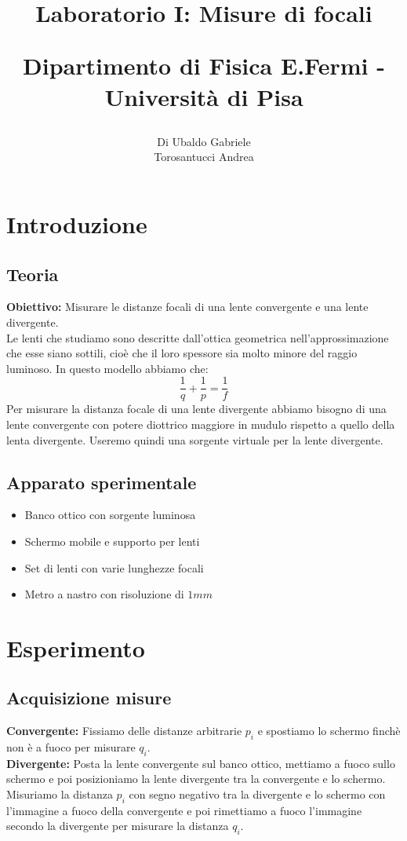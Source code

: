\documentclass[a4paper,10pt]{article}
\title{Laboratorio I: Misure di focali\\
\begin{large}
Dipartimento di Fisica E.Fermi - Università di Pisa
\end{large}}
\author{Di Ubaldo Gabriele \\Torosantucci Andrea}
\date{}
\begin{document}
\maketitle

\tableofcontents

\section{Introduzione}
\subsection{Teoria}
\textbf{Obiettivo:} Misurare le distanze focali di una lente convergente e una lente divergente.\\
Le lenti che studiamo sono descritte dall'ottica geometrica nell'approssimazione che esse siano sottili, cioè che il loro spessore sia molto minore del raggio luminoso.
In questo modello abbiamo che:
\begin{equation}
 \frac{1}{q}+\frac{1}{p}=\frac{1}{f}
\end{equation}
Per misurare la distanza focale di una lente divergente abbiamo bisogno di una lente convergente con potere diottrico maggiore in mudulo rispetto a quello della lenta divergente.
Useremo quindi una  sorgente virtuale per la lente divergente.
\subsection{Apparato sperimentale}
\begin{itemize}
\item{Banco ottico con sorgente luminosa}
\item{Schermo mobile e supporto per lenti}
\item{Set di lenti con varie lunghezze focali}
\item{Metro a nastro con risoluzione di $1mm$}
\end{itemize}

\section{Esperimento}
\subsection{Acquisizione misure}
\textbf{Convergente:} Fissiamo delle distanze arbitrarie $p_i$ e spostiamo lo schermo finchè non è a fuoco per misurare $q_i$. \\
\textbf{Divergente:} Posta la lente convergente sul banco ottico, mettiamo a fuoco sullo schermo e poi posizioniamo la lente divergente tra 
la convergente e lo schermo. Misuriamo la distanza $p_i$ con segno negativo  tra la divergente e lo schermo con l'immagine a fuoco della convergente  e poi rimettiamo a fuoco l'immagine secondo la divergente 
per misurare la distanza $q_i$.
\end{document}
